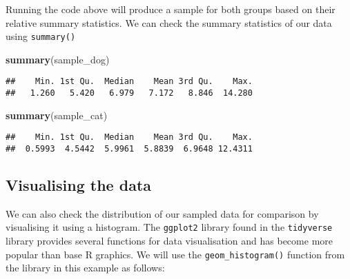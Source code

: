 \documentclass[
]{book}
\newenvironment{Shaded}{\begin{snugshade}}{\end{snugshade}}
\newcommand{\KeywordTok}[1]{\textcolor[rgb]{0.13,0.29,0.53}{\textbf{#1}}}
\newcommand{\NormalTok}[1]{#1}
\begin{document}
Running the code above will produce a sample for both groups based on their relative summary statistics. We can check the summary statistics of our data using \texttt{summary()}

\begin{Shaded}
\begin{Highlighting}[]
\KeywordTok{summary}\NormalTok{(sample_dog)}
\end{Highlighting}
\end{Shaded}

\begin{verbatim}
##    Min. 1st Qu.  Median    Mean 3rd Qu.    Max. 
##   1.260   5.420   6.979   7.172   8.846  14.280
\end{verbatim}

\begin{Shaded}
\begin{Highlighting}[]
\KeywordTok{summary}\NormalTok{(sample_cat)}
\end{Highlighting}
\end{Shaded}

\begin{verbatim}
##    Min. 1st Qu.  Median    Mean 3rd Qu.    Max. 
##  0.5993  4.5442  5.9961  5.8839  6.9648 12.4311
\end{verbatim}

\hypertarget{visualising-the-data}{%
\subsection{Visualising the data}\label{visualising-the-data}}

We can also check the distribution of our sampled data for comparison by visualising it using a histogram. The \texttt{ggplot2} library found in the \texttt{tidyverse} library provides several functions for data visualisation and has become more popular than base R graphics. We will use the \texttt{geom\_histogram()} function from the library in this example as follows:
\end{document}
